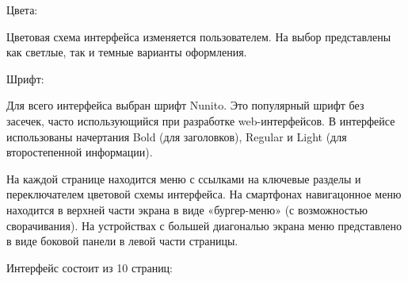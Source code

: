 \documentclass[project.tex]{subfiles}
\begin{document}
\par
Цвета:
\par
Цветовая схема интерфейса изменяется пользователем. На выбор представлены как светлые, так и темные варианты оформления.
\par
Шрифт:
\par
Для всего интерфейса выбран шрифт Nunito. Это популярный шрифт без засечек, часто использующийся при разработке web-интерфейсов. В интерфейсе использованы начертания Bold (для заголовков), Regular и Light (для второстепенной информации).
\par
На каждой странице находится меню с ссылками на ключевые разделы и переключателем цветовой схемы интерфейса. На смартфонах навигацонное меню находится в верхней части экрана в виде «бургер-меню» (с возможностью сворачивания).
На устройствах с большей диагональю экрана меню представлено в виде боковой панели в левой части страницы.
\par
\vspace{0.5cm}
Интерфейс состоит из 10 страниц:
\end{document}
